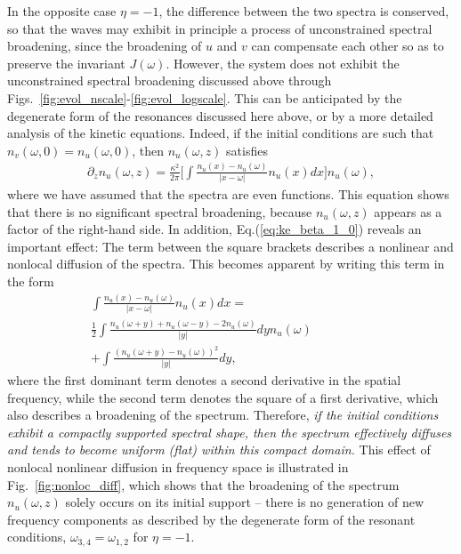 \documentclass[pra,twocolumn,showpacs,preprintnumbers,amsmath,amssymb]{revtex4}
\begin{document}
In the opposite case $\eta = -1$, the difference between the two spectra is conserved, so that the waves may exhibit in principle a process of unconstrained spectral broadening, since the broadening of $u$ and $v$ can compensate each other  so as to preserve the invariant $J(\omega)$.
However, the system does not exhibit the unconstrained  spectral broadening discussed above through Figs.~\ref{fig:evol_nscale}-\ref{fig:evol_logscale}. This can be anticipated by the degenerate form of the resonances discussed here above, or by a more detailed analysis of the kinetic equations. Indeed, if the initial conditions are such that $n_v(\omega,0) =  n_u(\omega,0)$, then $n_u(\omega,z)$ satisfies
\begin{eqnarray}
 \partial_z n_u(\omega,z) = \frac{\kappa^2}{2 \pi}
  \Big[ \int \frac{n_u(x)-n_u(\omega)}{|x -\omega|}   n_u(x) dx \Big] n_u(\omega),
\label{eq:ke_beta_1_0}
\end{eqnarray}
where we have assumed that the spectra are even functions. This equation shows that there is no significant spectral broadening, because $n_u(\omega,z)$ appears as a factor of the right-hand side.
In addition, Eq.(\ref{eq:ke_beta_1_0}) reveals an important effect: 
The term between the square brackets describes a nonlinear and nonlocal diffusion of the spectra.
This becomes apparent by writing this term in the form
\begin{eqnarray}
 \int \frac{n_u(x)-n_u(\omega)}{|x -\omega|}   n_u(x) dx = 
 \nonumber \quad \quad \quad \quad \quad \quad \quad \quad \quad \quad \\
 \frac{1}{2} \int \frac{n_u(\omega+y)+n_u(\omega-y)-2 n_u(\omega)}{|y|}  dy n_u(\omega) \nonumber \\
 +
\int \frac{(n_u(\omega+y)- n_u(\omega))^2}{|y|}  dy ,
\label{eq:ke_beta_1}
\end{eqnarray}
where the first dominant term denotes a second derivative in the spatial frequency, while the second term denotes the square of a first derivative, which also describes a broadening of the spectrum.
Therefore, {\it if the initial conditions   exhibit a compactly supported spectral shape, then the spectrum effectively diffuses and tends to become uniform (flat) within this compact domain.}
This effect of nonlocal nonlinear diffusion in frequency space is illustrated in Fig.~\ref{fig:nonloc_diff}, which shows that the broadening of the spectrum $n_u(\omega,z)$ solely occurs on its initial support -- there is no generation of new frequency components as described by the degenerate form of the resonant conditions, $\omega_{3,4}=\omega_{1,2}$ for $\eta=-1$.
\end{document}
